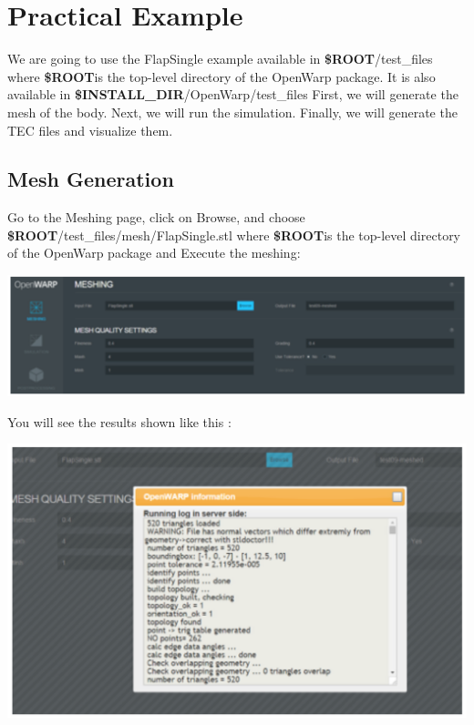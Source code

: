 \documentclass[12pt]{article}
\newcommand{\ROOT}{{\textbf{\$ROOT}}}
\newcommand{\INSTALLDIR}{{\textbf{\$INSTALL{\_}DIR}}}
\begin{document}
\section{Practical Example}

We are going to use the FlapSingle example available in \ROOT/test_files where \ROOT is the top-level directory of the OpenWarp package. It is also available in \INSTALLDIR/OpenWarp/test_files
First, we will generate the mesh of the body. Next, we will run the simulation. Finally, we will generate the TEC files and visualize them.

\subsection{Mesh Generation}
Go to the Meshing page, click on Browse, and choose \ROOT/test_files/mesh/FlapSingle.stl where \ROOT is the top-level directory of the OpenWarp package and Execute the meshing:

\vspace{\abovedisplayskip}
\begin{minipage}{\linewidth}
	\centering
	\includegraphics[scale=0.5]{img/42}
\end{minipage}
\vspace{\belowdisplayskip}




You will see the results shown like this :

\vspace{\abovedisplayskip}
\begin{minipage}{\linewidth}
	\centering
	\includegraphics[scale=0.5]{img/45}
\end{minipage}
\vspace{\belowdisplayskip}
\end{document}
